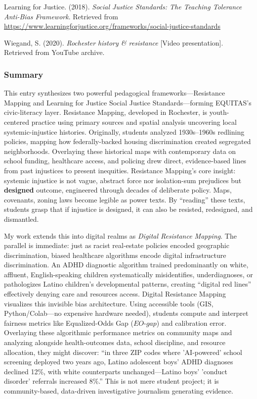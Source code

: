 \documentclass[11pt,twoside]{article}
\DeclareRobustCommand{\EOgap}{EO\text{-}gap\xspace}
\begin{document}
Learning for Justice. (2018). \textit{Social Justice Standards: The Teaching Tolerance Anti-Bias Framework}. Retrieved from \\
\href{https://www.learningforjustice.org/frameworks/social-justice-standards}{https://www.learningforjustice.org/frameworks/social-justice-standards}

Wiegand, S. (2020). \textit{Rochester history \& resistance} [Video presentation]. Retrieved from YouTube archive.

\vspace{-0.3cm}

\subsubsection*{Summary}

\vspace{-0.3cm}

This entry synthesizes two powerful pedagogical frameworks---Resistance Mapping and Learning for Justice Social Justice Standards---forming EQUITAS's civic-literacy layer. Resistance Mapping, developed in Rochester, is youth-centered practice using primary sources and spatial analysis uncovering local systemic-injustice histories. Originally, students analyzed 1930s--1960s redlining policies, mapping how federally-backed housing discrimination created segregated neighborhoods. Overlaying these historical maps with contemporary data on school funding, healthcare access, and policing drew direct, evidence-based lines from past injustices to present inequities. Resistance Mapping's core insight: systemic injustice is not vague, abstract force nor isolation-sum prejudices but \textbf{designed} outcome, engineered through decades of deliberate policy. Maps, covenants, zoning laws become legible as power texts. By ``reading'' these texts, students grasp that if injustice is designed, it can also be resisted, redesigned, and dismantled.

My work extends this into digital realms as \textit{Digital Resistance Mapping}. The parallel is immediate: just as racist real-estate policies encoded geographic discrimination, biased healthcare algorithms encode digital infrastructure discrimination. An ADHD diagnostic algorithm trained predominantly on white, affluent, English-speaking children systematically misidentifies, underdiagnoses, or pathologizes Latino children's developmental patterns, creating ``digital red lines'' effectively denying care and resources access. Digital Resistance Mapping visualizes this invisible bias architecture. Using accessible tools (GIS, Python/Colab---no expensive hardware needed), students compute and interpret fairness metrics like Equalized-Odds Gap ($\EOgap$) and calibration error. Overlaying these algorithmic performance metrics on community maps and analyzing alongside health-outcomes data, school discipline, and resource allocation, they might discover: ``in three ZIP codes where 'AI-powered' school screening deployed two years ago, Latino adolescent boys' ADHD diagnoses declined 12\%, with white counterparts unchanged---Latino boys' 'conduct disorder' referrals increased 8\%.'' This is not mere student project; it is community-based, data-driven investigative journalism generating evidence.
\end{document}
